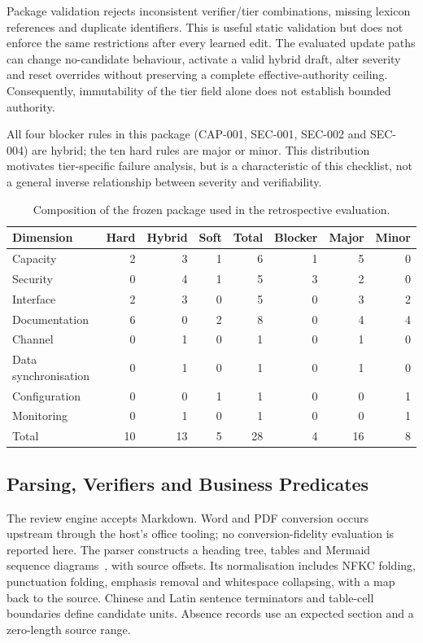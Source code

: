 Package validation rejects inconsistent verifier/tier combinations, missing lexicon references and duplicate identifiers. This is useful static validation but does not enforce the same restrictions after every learned edit. The evaluated update paths can change no-candidate behaviour, activate a valid hybrid draft, alter severity and reset overrides without preserving a complete effective-authority ceiling. Consequently, immutability of the tier field alone does not establish bounded authority.

All four blocker rules in this package (CAP-001, SEC-001, SEC-002 and SEC-004) are hybrid; the ten hard rules are major or minor. This distribution motivates tier-specific failure analysis, but is a characteristic of this checklist, not a general inverse relationship between severity and verifiability.

\begin{table}[!ht]
\caption{Composition of the frozen package used in the retrospective evaluation.}
\label{tab:composition}
\centering\footnotesize
\begin{tabular}{@{}lrrr rrrr@{}}
\toprule
Dimension & Hard & Hybrid & Soft & Total & Blocker & Major & Minor \\
\midrule
Capacity & 2 & 3 & 1 & 6 & 1 & 5 & 0 \\
Security & 0 & 4 & 1 & 5 & 3 & 2 & 0 \\
Interface & 2 & 3 & 0 & 5 & 0 & 3 & 2 \\
Documentation & 6 & 0 & 2 & 8 & 0 & 4 & 4 \\
Channel & 0 & 1 & 0 & 1 & 0 & 1 & 0 \\
Data synchronisation & 0 & 1 & 0 & 1 & 0 & 1 & 0 \\
Configuration & 0 & 0 & 1 & 1 & 0 & 0 & 1 \\
Monitoring & 0 & 1 & 0 & 1 & 0 & 0 & 1 \\
\midrule
Total & 10 & 13 & 5 & 28 & 4 & 16 & 8 \\
\bottomrule
\end{tabular}
\end{table}

\subsection{Parsing, Verifiers and Business Predicates}\label{sec:verifiers}

The review engine accepts Markdown. Word and PDF conversion occurs upstream through the host's office tooling; no conversion-fidelity evaluation is reported here. The parser constructs a heading tree, tables and Mermaid sequence diagrams~\cite{mermaid}, with source offsets. Its normalisation includes NFKC folding, punctuation folding, emphasis removal and whitespace collapsing, with a map back to the source. Chinese and Latin sentence terminators and table-cell boundaries define candidate units. Absence records use an expected section and a zero-length source range.

